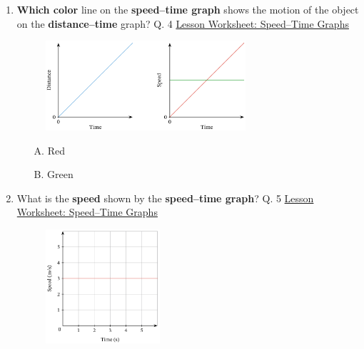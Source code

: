 \documentclass[A4,12pt]{article}
\begin{document}
\begin{enumerate}[label=\bfseries (\arabic*)]
\item \textbf{Which color} line on the \textbf{speed–time graph} shows the motion of the object on the \textbf{distance–time} graph? \cite{Nagwa} Q. 4 \href{https://www.nagwa.com/en/worksheets/257191315239/}{Lesson Worksheet: Speed–Time Graphs}
%
\begin{figure}[H]
    \centering
    \includegraphics[width=0.7\textwidth]{Nagwa_Q4_Speedt.png}
\end{figure}
%
\begin{itemize}
    \item[A.] Red
    \item[B.] Green
\end{itemize}
%









\item What is the \textbf{speed} shown by the \textbf{speed–time graph}? \cite{Nagwa} Q. 5 \href{https://www.nagwa.com/en/worksheets/257191315239/}{Lesson Worksheet: Speed–Time Graphs}
%
\begin{figure}[H]
    \centering
    \includegraphics[width=0.4\textwidth]{Nagwa_Q5_Speedt.png}
\end{figure}
%
%












\end{enumerate}
\end{document}
